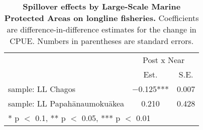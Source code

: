 \begin{table}

\caption{\label{tab:mpa_reg}\textbf{Spillover effects by Large-Scale Marine Protected Areas on longline fisheries.} Coefficients are
             difference-in-difference estimates for the change in CPUE. Numbers in parentheses are standard errors.}
\centering
\begin{tabular}[t]{lcc}
\toprule
\multicolumn{1}{c}{ } & \multicolumn{2}{c}{Post x Near} \\
\cmidrule(l{3pt}r{3pt}){2-3}
  & Est. & S.E.\\
\midrule
sample: LL Chagos & \num{-0.125}*** & \num{0.007}\\
sample: LL Papahānaumokuākea & \num{0.210} & \num{0.428}\\
\bottomrule
\multicolumn{3}{l}{\rule{0pt}{1em}* p $<$ 0.1, ** p $<$ 0.05, *** p $<$ 0.01}\\
\end{tabular}
\end{table}

